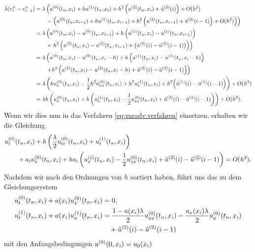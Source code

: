 {\small\begin{align*}
\lambda (v^n_{i} - v^n_{i-1})
&= \lambda \left( u^{(0)}(t_n, x_i) + h u^{(1)}(t_n, x_i) + h^2 \left(u^{(2)}(t_n, x_i) + \tilde u^{(2)}(i) \right) + O(h^2) \right.\\
   &\qquad -  \left. \left( u^{(0)}(t_n, x_{i-1}) + h u^{(1)}(t_n, x_{i-1}) + h^2 \left( u^{(2)}(t_n, x_{i-1}) + \tilde u^{(2)}(i-1)\right)  + O(h^2) \right) \right)\\
&= \lambda \left( u^{(0)}(t_n, x_i) - u^{(0)}(t_n, x_{i-1}) + h \left( u^{(1)}(t_n, x_i) - u^{(1)}(t_n, x_{i-1}) \right) \right.\\
   &\qquad + \left. h^2 \left( u^{(2)}(t_n, x_i) - u^{(2)}(t_n, x_{i-1}) + \bigl( \tilde u^{(2)}(i) - \tilde u^{(2)}(i-1) \bigr) \right) \right)\\
&= \lambda \left( u^{(0)}(t_n, x_i) - u^{(0)}(t_n, x_i-h) + h \left( u^{(1)}(t_n, x_i) - u^{(1)}(t_n, x_i-h) \right) \right. \\
   &\qquad \left. + h^2 \left( u^{(2)}(t_n, x_i) - u^{(2)}(t_n, x_i-h) + \tilde u^{(2)}(i) - \tilde u^{(2)}(i-1) \right) \right)\\
&= \lambda \left( h u^{(0)}_x(t_n, x_i) - \frac 12 h^2 u^{(0)}_{xx}(t_n, x_i) + h^2 u^{(1)}_x(t_n, x_i) + h^2\Bigl( \tilde u^{(1)}(i) - \tilde u^{(1)}(i-1) \Bigr) \right) + O(h^3) \\
&= \lambda h \left( u^{(0)}_x(t_n, x_i) + h \left( u^{(1)}_x(t_n, x_i) - \frac 12 u^{(0)}_{xx}(t_n, x_i) + \tilde u^{(2)}(i) - \tilde u^{(2)}(i-1) \right) \right) + O(h^3).
\end{align*}}
Wenn wir dies nun in das Verfahren \eqref{eq:varadv:verfahren} einsetzen, erhalten wir die Gleichung
\begin{align*}
&u^{(0)}_t (t_n, x_i) + h \left( \frac \lambda 2 u^{(0)}_{tt}(t_n, x_i) + u^{(1)}_t(t_n, x_i) \right)\\ 
&\qquad +  a_i u^{(0)}_x(t_n, x_i) + h a_i \left( u^{(1)}_x(t_n, x_i) - \frac 12 u^{(0)}_{xx}(t_n, x_i) + \tilde u^{(2)}(i) - \tilde u^{(2)}(i-1) \right) = O(h^2).
\end{align*}
Nachdem wir nach den Ordnungen von $h$ sortiert haben, führt uns das zu dem Gleichungssystem
\begin{align*}
u^{(0)}_t(t_n, x_i) + a(x_i) u^{(0)}_x(t_n, x_i) &= 0,\\
u^{(1)}_t(t_n, x_i) + a(x_i) u^{(1)}_x(t_n, x_i) &= \frac {1 - a(x_i)\lambda}{2} u^{(0)}_{xx}(t_n, x_i) - \frac {a_x(x_i) \lambda} 2 u^{(0)}_x(t_n, x_i)\\
                                         & \quad + \tilde u^{(2)}(i) - \tilde u^{(2)}(i-1)
\end{align*}
mit den Anfangsbedingungen $u^{(0)}(0, x_i) = u_0(x_i)$